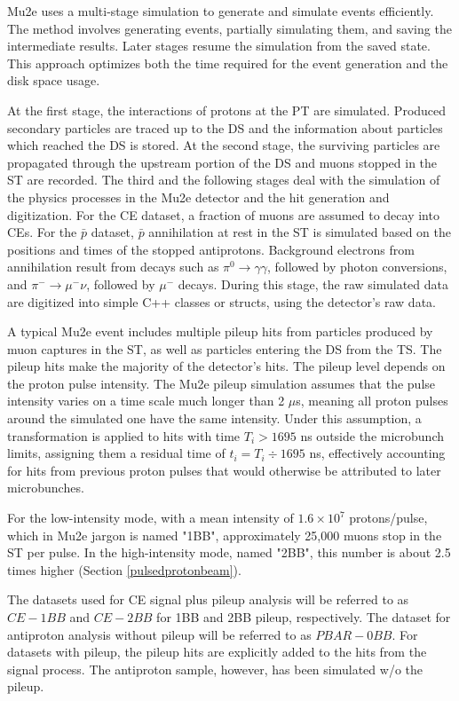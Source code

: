 Mu2e uses a multi-stage simulation to generate and simulate events efficiently. 
The method involves generating events, partially simulating 
them, and saving the intermediate results. Later stages resume the simulation from the saved 
state. This approach optimizes both the time required for the event generation 
and the disk space usage. 

At the first stage, the interactions of protons at the PT are simulated.
Produced secondary particles are traced
up to the DS and the information about particles which reached the DS is stored.
At the second stage, the surviving particles are propagated through the upstream portion of
the DS and muons stopped in the ST are recorded.
The third and the following stages deal with the simulation of the physics processes in the Mu2e detector and the hit generation and digitization.
For the CE dataset, a fraction of muons are assumed to decay into CEs. For the $\bar{p}$ dataset, 
$\bar{p}$ annihilation at rest in the ST is simulated based on the positions 
and times of the stopped antiprotons. Background electrons from annihilation 
result from decays such as $\pi^0 \to \gamma \gamma$, followed by photon conversions, and $\pi^- \to \mu^- \nu$, 
followed by $\mu^-$ decays. During this stage, the raw simulated data are digitized 
into simple C++ classes or structs, using the detector's raw data.

A typical Mu2e event includes multiple pileup hits from particles produced 
by muon captures in the ST, as well as particles entering the DS from 
the TS. The pileup hits make 
the majority of the detector's hits. The pileup level 
depends on the proton pulse intensity. The Mu2e pileup 
simulation assumes that the pulse intensity varies on a 
time scale much longer than 2 $\mu$s, meaning all proton 
pulses around the simulated one have the same intensity. 
Under this assumption, a transformation is applied to hits 
with time $T_i > 1695$ ns outside the microbunch limits, 
assigning them a residual time of $t_i = T_i \div 1695$ ns, 
effectively accounting for hits from previous proton pulses 
that would otherwise be attributed to later microbunches.

For the low-intensity mode, with a mean intensity of 
$1.6 \times 10^7$ protons/pulse, which in Mu2e 
jargon is named "1BB", approximately 25,000 
muons stop in the ST per pulse. In the high-intensity 
mode, named "2BB", this number is about 2.5 times higher (Section \ref{pulsedprotonbeam}).

The datasets used for CE signal plus pileup 
analysis will be referred to as $CE-1BB$ and $CE-2BB$ 
for 1BB and 2BB pileup, respectively. The dataset for 
antiproton analysis without pileup will be 
referred to as $PBAR-0BB$.
For datasets with pileup, 
the pileup hits are explicitly added to the hits from 
the signal process. The antiproton sample, however, 
has been simulated w/o the pileup. 
